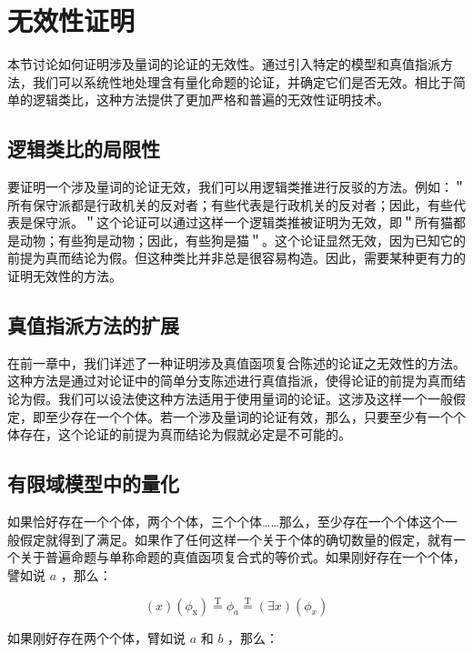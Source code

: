 \section{无效性证明}

\begin{logicbox}[title=引言]
本节讨论如何证明涉及量词的论证的无效性。通过引入特定的模型和真值指派方法，我们可以系统性地处理含有量化命题的论证，并确定它们是否无效。相比于简单的逻辑类比，这种方法提供了更加严格和普遍的无效性证明技术。
\end{logicbox}

\subsection{逻辑类比的局限性}

要证明一个涉及量词的论证无效，我们可以用逻辑类推进行反驳的方法。例如：＂所有保守派都是行政机关的反对者；有些代表是行政机关的反对者；因此，有些代表是保守派。＂这个论证可以通过这样一个逻辑类推被证明为无效，即＂所有猫都是动物；有些狗是动物；因此，有些狗是猫＂。这个论证显然无效，因为已知它的前提为真而结论为假。但这种类比并非总是很容易构造。因此，需要某种更有力的证明无效性的方法。

\subsection{真值指派方法的扩展}

在前一章中，我们详述了一种证明涉及真值函项复合陈述的论证之无效性的方法。这种方法是通过对论证中的简单分支陈述进行真值指派，使得论证的前提为真而结论为假。我们可以设法使这种方法适用于使用量词的论证。这涉及这样一个一般假定，即至少存在一个个体。若一个涉及量词的论证有效，那么，只要至少有一个个体存在，这个论证的前提为真而结论为假就必定是不可能的。

\subsection{有限域模型中的量化}

如果恰好存在一个个体，两个个体，三个个体……那么，至少存在一个个体这个一般假定就得到了满足。如果作了任何这样一个关于个体的确切数量的假定，就有一个关于普遍命题与单称命题的真值函项复合式的等价式。如果刚好存在一个个体，譬如说 $a$ ，那么：

$$
(x)\left(\phi_{\mathrm{x}}\right) \stackrel{\mathrm{T}}{=} \phi_{a} \stackrel{\mathrm{T}}{=}(\exists x)\left(\phi_{x}\right)
$$

如果刚好存在两个个体，臂如说 $a$ 和 $b$ ，那么：

